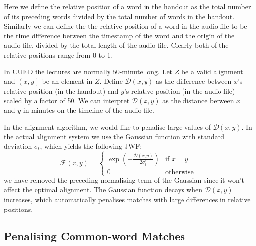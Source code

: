 Here we define the relative position of a word in the handout as the total number of its preceding words divided by the total number of words in the handout. Similarly we can define the the relative position of a word in the audio file to be the time difference between the timestamp of the word and the origin of the audio file, divided by the total length of the audio file. Clearly both of the relative positions range from 0 to 1.

In CUED the lectures are normally 50-minute long. Let $Z$ be a valid alignment and $(x,y)$ be an element in $Z$. Define $\mathcal{D}(x,y)$ as the difference between $x$'s relative position (in the handout) and $y$'s relative position (in the audio file) scaled by a factor of 50. We can interpret $\mathcal{D}(x,y)$ as the distance between $x$ and $y$ in minutes on the timeline of the audio file.

In the alignment algorithm, we would like to penalise large values of $\mathcal{D}(x,y)$. In the actual alignment system we use the Gaussian function with standard deviation $\sigma_t$, which yields the following JWF:
\begin{equation}
  \mathcal{F}(x,y) = 
  \begin{cases}
    \exp \left(-\frac{\mathcal{D}(x,y)}{2 \sigma_t^2}\right) & \text{if } x = y\\
    0 & \text{otherwise}
  \end{cases}
  \label{eq:jwf-gauss}
\end{equation}
we have removed the preceding normalising term of the Gaussian since it won't affect the optimal alignment. The Gaussian function decays when $\mathcal{D}(x,y)$ increases, which automatically penalises matches with large differences in relative positions.

\subsection{Penalising Common-word Matches}
\label{subsec:common-word-penalty}

